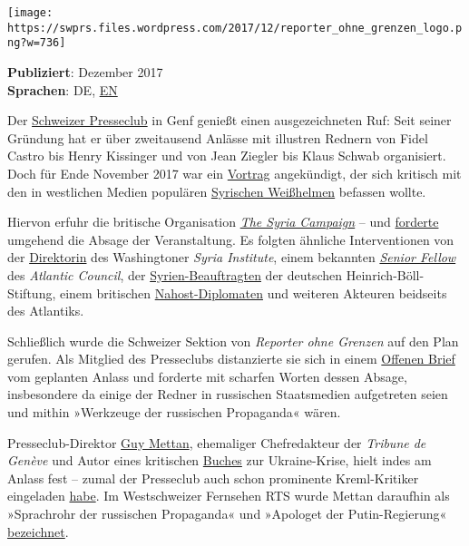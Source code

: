 \texttt{[image: https://swprs.files.wordpress.com/2017/12/reporter\_ohne\_grenzen\_logo.png?w=736]}

\textbf{Publiziert}: Dezember 2017\\
\textbf{Sprachen}: DE,
\href{https://swprs.org/beyond-the-borders-of-press-freedom/}{EN}

Der \href{http://pressclub.ch/?lang=en}{Schweizer Presseclub} in Genf
genießt einen ausgezeichneten Ruf: Seit seiner Gründung hat er über
zweitausend Anlässe mit illustren Rednern von Fidel Castro bis Henry
Kissinger und von Jean Ziegler bis Klaus Schwab organisiert. Doch für
Ende November 2017 war ein
\href{http://pressclub.ch/they-dont-care-about-us-white-helmets-true-agenda/?lang=en}{Vortrag}
angekündigt, der sich kritisch mit den in westlichen Medien populären
\href{https://www.hintergrund.de/globales/kriege/weisse-helme-ohne-weisse-westen/}{Syrischen
Weißhelmen} befassen wollte.

Hiervon erfuhr die britische Organisation
\href{https://www.alternet.org/world/inside-shadowy-pr-firm-thats-driving-western-opinion-towards-regime-change-syria}{\emph{The
Syria Campaign}} -- und
\href{https://twitter.com/thesyriacmpgn/status/932700267891580928}{forderte}
umgehend die Absage der Veranstaltung. Es folgten ähnliche
Interventionen von der
\href{https://twitter.com/vszyb/status/932806799388020736}{Direktorin}
des Washingtoner \emph{Syria Institute}, einem bekannten
\emph{\href{https://twitter.com/EliotHiggins/status/932887474925432832}{Senior
Fellow}} des \emph{Atlantic Council}, der
\href{https://twitter.com/BenteScheller/status/932892645831127040}{Syrien-Beauftragten}
der deutschen Heinrich-Böll-Stiftung, einem britischen
\href{https://twitter.com/BenJarlath/status/932644417944604672}{Nahost-Diplomaten}
und weiteren Akteuren beidseits des Atlantiks.

Schließlich wurde die Schweizer Sektion von \emph{Reporter ohne Grenzen}
auf den Plan gerufen. Als Mitglied des Presseclubs distanzierte sie sich
in einem
\href{https://www.tdg.ch/geneve/actu-genevoise/Guy-Mettan-somme-d-annuler-une-conference/story/14091151}{Offenen
Brief} vom geplanten Anlass und forderte mit scharfen Worten dessen
Absage, insbesondere da einige der Redner in russischen Staatsmedien
aufgetreten seien und mithin »Werkzeuge der russischen Propaganda«
wären.

Presseclub-Direktor \href{https://fr.wikipedia.org/wiki/Guy_Mettan}{Guy
Mettan}, ehemaliger Chefredakteur der \emph{Tribune de Genève} und Autor
eines kritischen
\href{https://www.amazon.de/Russie-Occident-une-guerre-mille-ans/dp/2940523185}{Buches}
zur Ukraine-Krise, hielt indes am Anlass fest -- zumal der Presseclub
auch schon prominente Kreml-Kritiker eingeladen
\href{https://www.rt.com/news/411373-white-helmets-switzerland-rsf/}{habe}.
Im Westschweizer Fernsehen RTS wurde Mettan daraufhin als »Sprachrohr
der russischen Propaganda« und »Apologet der Putin-Regierung«
\href{https://www.rts.ch/info/suisse/9126243-guy-mettan-a-nouveau-accuse-de-servir-de-relais-a-la-propagande-russe.html}{bezeichnet}.

